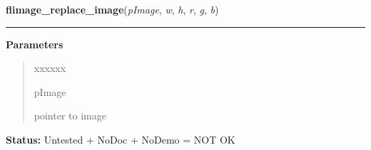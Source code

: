 \hspace{.8\funcindent}\begin{boxedminipage}{\funcwidth}

    \raggedright \textbf{flimage\_replace\_image}(\textit{pImage}, \textit{w}, \textit{h}, \textit{r}, \textit{g}, \textit{b})

    \vspace{-1.5ex}

    \rule{\textwidth}{0.5\fboxrule}
\setlength{\parskip}{2ex}
\setlength{\parskip}{1ex}
      \textbf{Parameters}
      \vspace{-1ex}

      \begin{quote}
        \begin{Ventry}{xxxxxx}

          \item[pImage]

          pointer to image

        \end{Ventry}

      \end{quote}

\textbf{Status:} Untested + NoDoc + NoDemo = NOT OK



    \end{boxedminipage}

    \label{xformslib:library:flimage_swapbuffer}

    \vspace{0.5ex}


